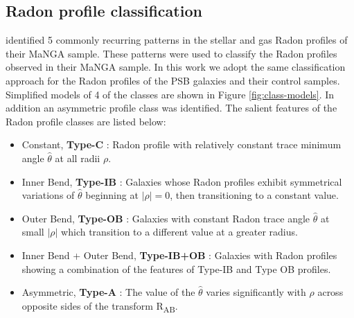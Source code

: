 \subsection{Radon profile classification}
\label{sec:Radon-classification}

\cite{2018MNRAS.480.2217S} identified 5 commonly recurring patterns in the stellar and gas Radon profiles of their MaNGA sample. These patterns were used to classify the Radon profiles observed in their MaNGA sample. In this work we adopt the same classification approach for the Radon profiles of the PSB galaxies and their control samples. Simplified models of 4 of the classes are shown in Figure \ref{fig:class-models}. In addition an asymmetric profile class was identified. The salient features of the Radon profile classes are listed below:

\begin{itemize}
    \item Constant, \textbf{Type-C} : Radon profile with relatively constant trace minimum angle $\hat{\theta}$ at all radii $\rho$.
    \item Inner Bend, \textbf{Type-IB} : Galaxies whose Radon profiles exhibit symmetrical variations of $\hat{\theta}$ beginning at $|\rho|=0$, then transitioning to a constant value. 
    \item Outer Bend, \textbf{Type-OB} : Galaxies with constant Radon trace angle $\hat{\theta}$  at small $|\rho|$ which transition to a different value at a greater radius. 
    \item Inner Bend + Outer Bend, \textbf{Type-IB+OB} : Galaxies with Radon profiles showing a combination of the features of Type-IB and Type OB profiles.
    \item Asymmetric, \textbf{Type-A} : The value of the $\hat{\theta}$ varies significantly with $\rho$ across opposite sides of the transform R\textsubscript{AB}. 
 \end{itemize}

